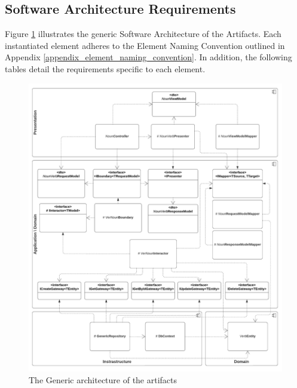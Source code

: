 \subsection{Software Architecture Requirements}

Figure \ref{fig_design} illustrates the generic Software Architecture of the Artifacts.
Each instantiated element adheres to the Element Naming Convention outlined in Appendix
\ref{appendix_element_naming_convention}. In addition, the following tables detail the
requirements specific to each element.

\begin{figure}[H]
    \centering
    \includegraphics[width=1\textwidth]{figures/generic_design.pdf}
    \caption[Generic architecture]{The Generic architecture of the artifacts}
    \label{fig_design}
\end{figure}


